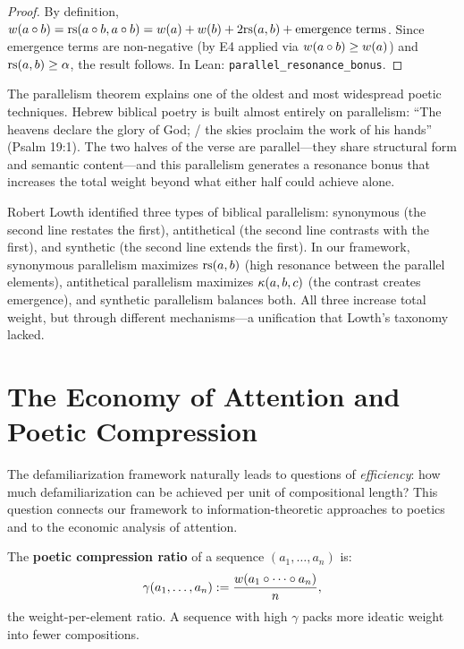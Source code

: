 \begin{proof}
By definition, $w(a \circ b) = \mathrm{rs}(a \circ b, a \circ b) = w(a) + w(b) + 2\mathrm{rs}(a, b) + \text{emergence terms}$.  Since emergence terms are non-negative (by E4 applied via $w(a \circ b) \geq w(a)$) and $\mathrm{rs}(a, b) \geq \alpha$, the result follows.  In Lean: \texttt{parallel\_resonance\_bonus}.
\end{proof}

\begin{interpretation}
\label{interp:biblical-parallel}
The parallelism theorem explains one of the oldest and most widespread poetic techniques.  Hebrew biblical poetry is built almost entirely on parallelism: ``The heavens declare the glory of God; / the skies proclaim the work of his hands'' (Psalm 19:1).  The two halves of the verse are parallel---they share structural form and semantic content---and this parallelism generates a resonance bonus that increases the total weight beyond what either half could achieve alone.

Robert Lowth identified three types of biblical parallelism: synonymous (the second line restates the first), antithetical (the second line contrasts with the first), and synthetic (the second line extends the first).  In our framework, synonymous parallelism maximizes $\mathrm{rs}(a, b)$ (high resonance between the parallel elements), antithetical parallelism maximizes $\kappa(a, b, c)$ (the contrast creates emergence), and synthetic parallelism balances both.  All three increase total weight, but through different mechanisms---a unification that Lowth's taxonomy lacked.
\end{interpretation}


\section{The Economy of Attention and Poetic Compression}

The defamiliarization framework naturally leads to questions of \emph{efficiency}:
how much defamiliarization can be achieved per unit of compositional length?
This question connects our framework to information-theoretic approaches to
poetics and to the economic analysis of attention.

\begin{definition}
\label{def:compression-ratio}
The \textbf{poetic compression ratio} of a sequence $(a_1, \ldots, a_n)$ is:
\[
  \gamma(a_1, \ldots, a_n) := \frac{w(a_1 \circ \cdots \circ a_n)}{n},
\]
the weight-per-element ratio.  A sequence with high $\gamma$ packs more
ideatic weight into fewer compositions.
\end{definition}

